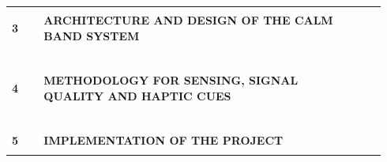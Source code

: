 \documentclass[12pt,letterpaper,oneside]{report}
\begin{document}
{\begin{longtable}{@{}p{0.08\linewidth}p{0.76\linewidth}>{\raggedleft\arraybackslash}p{0.1\linewidth}@{}}
 & \hspace{1.2em}{\small Research Gap} & {\small\pageref{sec:2.7}} \\
\textbf{3} & \textbf{ARCHITECTURE AND DESIGN OF THE CALM BAND SYSTEM} & \textbf{\pageref{ch:3}} \\
 & \hspace{1.2em}{\small System Architecture and Components} & {\small\pageref{sec:3.1}} \\
 & \hspace{1.2em}{\small Workflow of the System} & {\small\pageref{sec:3.2}} \\
 & \hspace{1.2em}{\small Technology Stack} & {\small\pageref{sec:3.3}} \\
 & \hspace{1.2em}{\small Hardware Design and Physical Layout} & {\small\pageref{sec:3.4}} \\
 & \hspace{1.2em}{\small Firmware Design} & {\small\pageref{sec:3.5}} \\
 & \hspace{1.2em}{\small Backend and Companion Design} & {\small\pageref{sec:3.6}} \\
\textbf{4} & \textbf{METHODOLOGY FOR SENSING, SIGNAL QUALITY AND HAPTIC CUES} & \textbf{\pageref{ch:4}} \\
 & \hspace{1.2em}{\small Sampling and Feature Windows} & {\small\pageref{sec:4.1}} \\
 & \hspace{1.2em}{\small Contact, Pulse and Motion Features} & {\small\pageref{sec:4.2}} \\
 & \hspace{1.2em}{\small Signal Quality and Eligibility Rules} & {\small\pageref{sec:4.3}} \\
 & \hspace{1.2em}{\small Command Protocol and Safety Checks} & {\small\pageref{sec:4.4}} \\
 & \hspace{1.2em}{\small Programming Languages and Libraries Used} & {\small\pageref{sec:4.5}} \\
 & \hspace{1.2em}{\small Planned Stress Estimation (Machine Learning)} & {\small\pageref{sec:4.6}} \\
\textbf{5} & \textbf{IMPLEMENTATION OF THE PROJECT} & \textbf{\pageref{ch:5}} \\
 & \hspace{1.2em}{\small Firmware Implementation} & {\small\pageref{sec:5.1}} \\

\end{longtable}}
\end{document}
